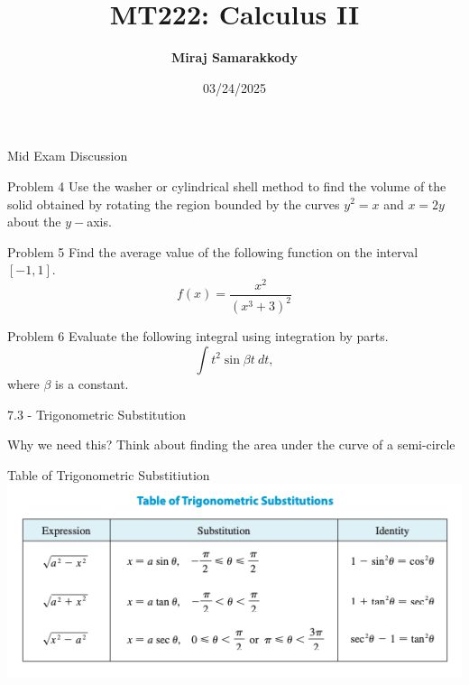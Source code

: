 \documentclass{beamer}
\title{MT222: Calculus II}
\author{\textbf{Miraj Samarakkody}}
\institute{Tougaloo College}
\date{03/24/2025}
\begin{document}
\begin{frame}
    \titlepage
\end{frame}


\begin{frame}{}
    \begin{center}
        \Huge{Mid Exam Discussion}
    \end{center}
    
\end{frame}





\begin{frame}{Problem 4}
    Use the washer or cylindrical shell method to find the volume of the solid obtained by rotating the region bounded by the curves $y^2=x$ and $x=2y$ about the $y-$axis.
\end{frame}

\begin{frame}{Problem 5}
    Find the average value of the following function on the interval \([-1,1]\). 
\[
f(x)=\dfrac{x^2}{(x^3+3)^2}
\] 
\end{frame}

\begin{frame}{Problem 6}
    Evaluate the following integral using integration by parts.
\[
\int t^2 \sin {\beta t}~dt,
\] where \(\beta \) is a constant. 
\end{frame}

\begin{frame}{}
    \begin{center}
        \Huge{7.3 - Trigonometric Substitution}
    \end{center}
    
\end{frame}

\begin{frame}{Why we need this?}
    Think about finding the area under the curve of a semi-circle
\end{frame}

\begin{frame}{Table of Trigonometric Substitiution}
    \includegraphics[scale=0.6]{figures/fig_1.png}
\end{frame}
\end{document}

